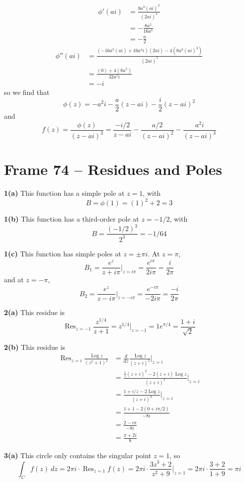 \documentclass{article}
\DeclareMathOperator{\Log}{Log}
\DeclareMathOperator{\Res}{Res}
\begin{document}
\begin{align*}
	\phi'(ai)
	&= \frac{8a^3(ai)^2}{(2ai)^4} \\
	&= -\frac{8a^5}{16a^4} \\
	&= -\frac{a}{2}
\end{align*}
\begin{align*}
	\phi''(ai)
	&= \frac{(-16a^3(ai) + 16a^4 i)(2ai) - 4(8a^3(ai)^2)}{(2ai)^5} \\
	&= \frac{(0) + 4(8a^5)}{32a^5 i} \\
	&= -i
\end{align*}
so we find that
\[
	\phi(z)
	= -a^2 i - \frac{a}{2} (z - ai) - \frac{i}{2} (z - ai)^2
\]
and
\[
	f(z) = \frac{\phi(z)}{(z - ai)^3}
	= \frac{-i/2}{z - ai} - \frac{a/2}{(z - ai)^2} - \frac{a^2 i}{(z - ai)^3}
\]


\clearpage
\section{Frame 74 -- Residues and Poles}
\textbf{1(a)}
This function has a simple pole at $z = 1$, with
\[
	B = \phi(1) = (1)^2 + 2 = 3 
\]

\textbf{1(b)}
This function has a third-order pole at $z = -1/2$, with
\[
	B = \frac{(-1/2)^3}{2^3} = -1/64
\]

\textbf{1(c)}
This function has simple poles at $z = \pm \pi i$. At $z = \pi$,
\[
	B_1 = \frac{e^z}{z + i\pi} \Big|_{z = i\pi}
	= \frac{e^{i\pi}}{2i\pi}
	= \frac{i}{2\pi}
\]
and at $z = -\pi$,
\[
	B_2 = \frac{e^z}{z - i\pi} \Big|_{z = -i\pi}
	= \frac{e^{-i\pi}}{-2i\pi}
	= \frac{-i}{2\pi}
\]

\textbf{2(a)}
This residue is
\[
	\Res_{z = -1} \frac{z^{1/4}}{z + 1}
	= z^{1/4} \Big|_{z = -1}
	= 1e^{\pi/4}
	= \frac{1 + i}{\sqrt{2}}
\]

\textbf{2(b)}
This residue is
\begin{align*}
	\Res_{z = i} \frac{\Log z}{(z^2 + 1)^2}
	&= \frac{d}{dz} \frac{\Log z}{(z + i)^2} \Big|_{z = i} \\
	&= \frac{\frac{1}{z}(z + i)^2 - 2(z + i)\Log z}{(z + i)^4} \Big|_{z = i} \\
	&= \frac{1 + i/z - 2\Log z}{(z + i)^3} \Big|_{z = i} \\
	&= \frac{1 + 1 - 2(0 + i\pi/2)}{-8i} \\
	&= \frac{2 - i \pi}{-8i} \\
	&= \frac{\pi + 2i}{8}
\end{align*}

\textbf{3(a)}
This circle only contains the singular point $z = 1$, so
\[
	\int_C f(z)~dz
	= 2\pi i \cdot \Res_{z = 1} f(z)
	= 2\pi i \cdot \frac{3z^3 + 2}{z^2 + 9} \Big|_{z = 1}
	= 2\pi i \cdot \frac{3 + 2}{1 + 9}
	= \pi i
\]
\end{document}
